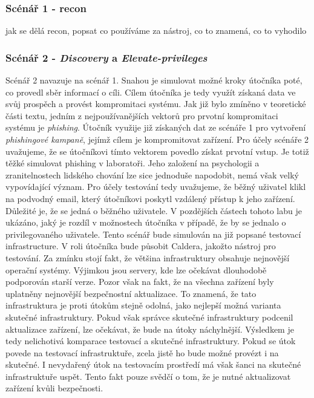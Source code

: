 \subsubsection{Scénář 1 - recon}
jak se dělá recon, popsat co používáme za nástroj, co to znamená, co to vyhodilo

\subsubsection{Scénář 2 - \textit{Discovery} a \textit{Elevate-privileges}}
Scénář 2 navazuje na scénář 1.
Snahou je simulovat možné kroky útočníka poté, co provedl sběr informací o cíli.
Cílem útočníka je tedy využít získaná data ve svůj prospěch a provést kompromitaci systému.
Jak již bylo zmíněno v teoretické části textu, jedním z nejpoužívanějších vektorů pro prvotní kompromitaci systému je \textit{phishing}.
Útočník využije již získaných dat ze scénáře 1 pro vytvoření \textit{phishingové kampaně}, jejímž cílem je kompromitovat zařízení.
Pro účely scénáře 2 uvažujeme, že se útočníkovi tímto vektorem povedlo získat prvotní vstup.
Je totiž těžké simulovat phishing v laboratoři.
Jeho založení na psychologii a zranitelnostech lidského chování lze sice jednoduše napodobit, nemá však velký vypovídající význam.
Pro účely testování tedy uvažujeme, že běžný uživatel klikl na podvodný email, který útočníkovi poskytl vzdálený přístup k jeho zařízení.
Důležité je, že se jedná o běžného uživatele.
V pozdějších částech tohoto labu je ukázáno, jaký je rozdíl v možnostech útočníka v případě, že by se jednalo o privilegovaného uživatele.
Tento scénář bude simulován na již popsané testovací infrastructure.
V roli útočníka bude působit Caldera, jakožto nástroj pro testování.
Za zmínku stojí fakt, že většina infrastruktury obsahuje nejnovější operační systémy.
Výjimkou jsou servery, kde lze očekávat dlouhodobě podporován starší verze.
Pozor však na fakt, že na všechna zařízení byly uplatněny nejnovější bezpečnostní aktualizace.
To znamená, že tato infrastruktura je proti útokům stejně odolná, jako nejlepší možná varianta skutečné infrastruktury.
Pokud však správce skutečné infrastruktury podcenil aktualizace zařízení, lze očekávat, že bude na útoky náchylnější.
Výsledkem je tedy nelichotivá komparace testovací a skutečné infrastruktury.
Pokud se útok povede na testovací infrastruktuře, zcela jistě ho bude možné provézt i na skutečné.
I nevydařený útok na testovacím prostředí má však šanci na skutečné infrastruktuře uspět.
Tento fakt pouze svědčí o tom, že je nutné aktualizovat zařízení kvůli bezpečnosti.


